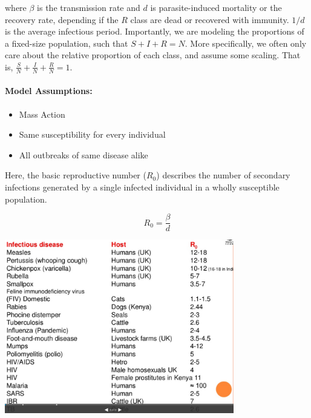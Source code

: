 \documentclass[12pt]{article}
\begin{document}
where $\beta$ is the transmission rate and $d$ is parasite-induced mortality or the recovery rate, depending if the $R$ class are dead or recovered with immunity. $1/d$ is the average infectious period. Importantly, we are modeling the proportions of a fixed-size population, such that $S+I+R = N$. More specifically, we often only care about the relative proportion of each class, and assume some scaling. That is, $\frac{S}{N}+\frac{I}{N}+\frac{R}{N} = 1$.





\paragraph*{Model Assumptions:}
\begin{itemize}
	\item Mass Action
	\item Same susceptibility for every individual
	\item All outbreaks of same disease alike
\end{itemize}















Here, the basic reproductive number ($R_0$) describes the number of secondary infections generated by a single infected individual in a wholly susceptible population. 


\begin{equation}
R_0 = \frac{\beta}{d}
\end{equation}



\includegraphics[width=0.75\textwidth]{figs/r0.png}
\end{document}
